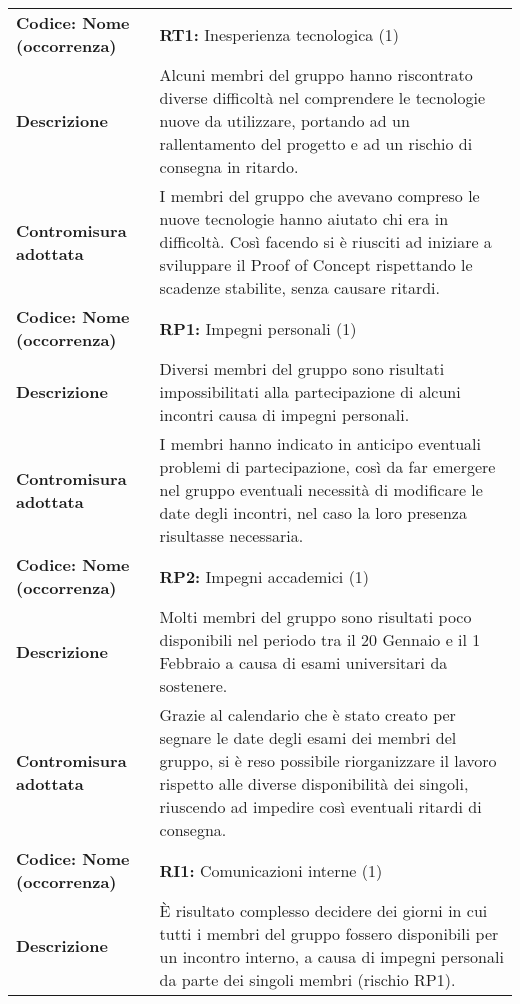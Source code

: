 \setcounter{table}{-1}
{


\centering
\renewcommand{\arraystretch}{1.5}
\begin{longtable}{C{3.5cm} | C{11cm}}
\textbf{Codice: Nome (occorrenza)} & \textbf{RT1: }{Inesperienza tecnologica (1)}\\
\textbf{Descrizione} & Alcuni membri del gruppo hanno riscontrato diverse difficoltà nel comprendere le tecnologie nuove da utilizzare, portando ad un rallentamento del progetto e ad un rischio di consegna in ritardo.\\
\textbf{Contromisura adottata} & I membri del gruppo che avevano compreso le nuove tecnologie hanno aiutato chi era in difficoltà. Così facendo si è riusciti ad iniziare a sviluppare il Proof of Concept rispettando le scadenze stabilite, senza causare ritardi.\\
\hline
{}\textbf{Codice: Nome (occorrenza)} & \textbf{RP1: }{Impegni personali (1)}\\
\textbf{Descrizione} & Diversi membri del gruppo sono risultati impossibilitati alla partecipazione di alcuni incontri causa di impegni personali.\\ 
\textbf{Contromisura adottata} & I membri hanno indicato in anticipo eventuali problemi di partecipazione, così da far emergere nel gruppo eventuali necessità di modificare le date degli incontri, nel caso la loro presenza risultasse necessaria.\\
\hline
\hline
{}\textbf{Codice: Nome (occorrenza)} & \textbf{RP2: }{Impegni accademici (1)}\\ 
\textbf{Descrizione} & Molti membri del gruppo sono risultati poco disponibili nel periodo tra il 20 Gennaio e il 1 Febbraio a causa di esami universitari da sostenere.\\
\textbf{Contromisura adottata} & Grazie al calendario che è stato creato per segnare le date degli esami dei membri del gruppo, si è reso possibile riorganizzare il lavoro rispetto alle diverse disponibilità dei singoli, riuscendo ad impedire così eventuali ritardi di consegna.\\
\hline
\hline
{}\textbf{Codice: Nome (occorrenza)} & \textbf{RI1: }{Comunicazioni interne (1)}\\
\textbf{Descrizione} & È risultato complesso decidere dei giorni in cui tutti i membri del gruppo fossero disponibili per un incontro interno, a causa di impegni personali da parte dei singoli membri (rischio RP1).\\ 

\end{longtable}}
